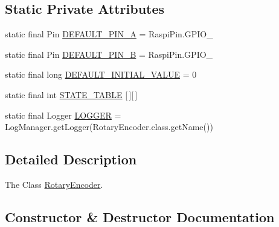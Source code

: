 \subsection*{Static Private Attributes}
\begin{DoxyCompactItemize}
\item 
static final Pin \hyperlink{classcom_1_1libsensorj_1_1concretesensor_1_1RotaryEncoder_a1b700b49b4e85eb1161d4042f2f57b3d}{D\+E\+F\+A\+U\+L\+T\+\_\+\+P\+I\+N\+\_\+\+A} = Raspi\+Pin.\+G\+P\+I\+O\+\_
\item 
static final Pin \hyperlink{classcom_1_1libsensorj_1_1concretesensor_1_1RotaryEncoder_aaebc5899516aa9385d1ddbb8ed4b12bc}{D\+E\+F\+A\+U\+L\+T\+\_\+\+P\+I\+N\+\_\+\+B} = Raspi\+Pin.\+G\+P\+I\+O\+\_
\item 
static final long \hyperlink{classcom_1_1libsensorj_1_1concretesensor_1_1RotaryEncoder_ad5997b6407cda9bd936b90a82e86458a}{D\+E\+F\+A\+U\+L\+T\+\_\+\+I\+N\+I\+T\+I\+A\+L\+\_\+\+V\+A\+L\+U\+E} = 0
\item 
static final int \hyperlink{classcom_1_1libsensorj_1_1concretesensor_1_1RotaryEncoder_aca1c89ca07e97ca484ae85517660b9f0}{S\+T\+A\+T\+E\+\_\+\+T\+A\+B\+L\+E} \mbox{[}$\,$\mbox{]}\mbox{[}$\,$\mbox{]}
\item 
static final Logger \hyperlink{classcom_1_1libsensorj_1_1concretesensor_1_1RotaryEncoder_a0f4f58edd0f2ed3bf053b3578cfc3a8f}{L\+O\+G\+G\+E\+R} = Log\+Manager.\+get\+Logger(Rotary\+Encoder.\+class.\+get\+Name())
\end{DoxyCompactItemize}


\subsection{Detailed Description}
The Class \hyperlink{classcom_1_1libsensorj_1_1concretesensor_1_1RotaryEncoder}{Rotary\+Encoder}. 

\subsection{Constructor \& Destructor Documentation}
\hypertarget{classcom_1_1libsensorj_1_1concretesensor_1_1RotaryEncoder_af6db9e02c77d1fe91adbd15162f18c76}{}
